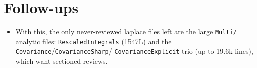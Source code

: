 \documentclass[11pt]{article}
\begin{document}
\section{Follow-ups}
\begin{itemize}[noitemsep]
  \item With this, the only never-reviewed laplace files left are the large \texttt{Multi/} analytic
    files: \texttt{RescaledIntegrals} (1547L) and the \texttt{Covariance}/\texttt{CovarianceSharp}/
    \texttt{CovarianceExplicit} trio (up to 19.6k lines), which want sectioned reviews.
\end{itemize}
\end{document}
